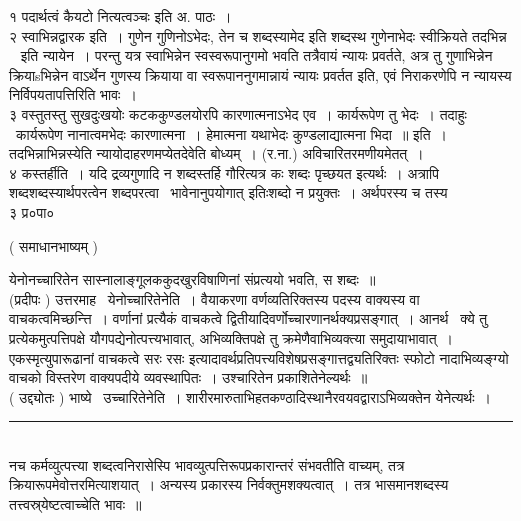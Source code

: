 \documentclass[11pt, openany]{book}
\begin{document}
\begin{multicols}{2}
१ पदार्थत्वं कैयटो नित्यत्वञ्चः इति अ. पाठः~।\\

२ स्वाभिन्नद्वारक इति~। गुणेन गुणिनोऽभेदः, तेन च शब्दस्यामेद इति शब्दस्थ गुणेनाभेदः स्वीक्रियते {\qt तदभिन्न \textendash\ } इति न्यायेन~। परन्तु यत्र स्वाभिन्नेन स्वस्वरूपानुगमो भवति तत्रैवायं न्यायः प्रवर्तते, अत्र तु गुणाभिन्नेन क्रियाsभिन्नेन वाऽर्थेन गुणस्य क्रियाया वा स्वरूपाननुगमान्नायं न्यायः प्रवर्तत इति, एवं निराकरणेपि न न्यायस्य निर्विपयतापत्तिरिति भावः~।\\

३ वस्तुतस्तु सुखदुःखयोः कटककुण्डलयोरपि कारणात्मनाऽभेद एव~। कार्यरूपेण तु भेदः~। तदाहुः \textendash\ {\qt कार्यरूपेण नानात्वमभेदः कारणात्मना~। हेमात्मना यथाभेदः कुण्डलाद्यात्मना भिदा~॥} इति~। तदभिन्नाभिन्नस्येति न्यायोदाहरणमप्येतदेवेति बोध्यम्~। (र.ना.) अविचारितरमणीयमेतत्~।\\

४ कस्तर्हीति~। यदि द्रव्यगुणादि न शब्दस्तर्हि गौरित्यत्र कः शब्दः पृच्छयत इत्यर्थः~। अत्रापि शब्दशब्दस्यार्थपरत्वेन शब्दपरत्वा \textendash\ भावेनानुपयोगात् इतिःशब्दो न प्रयुक्तः~। अर्थपरस्य च तस्य\\

३ प्र०पा० 

\columnbreak

\begin{center}
( समाधानभाष्यम् )
\end{center}

येनोनच्चारितेन सास्नालाङ्गूलककुदखुरविषाणिनां संप्रत्ययो भवति, स शब्दः~॥\\

(प्रदीपः ) उत्तरमाह \textendash\ येनोच्चारितेनेति~। वैयाकरणा वर्णव्यतिरिक्तस्य पदस्य वाक्यस्य वा वाचकत्वमिच्छन्त्ति~। वर्णानां प्रत्यैकं वाचकत्वे द्वितीयादिवर्णोच्चारणानर्थक्यप्रसङ्गात्~। आनर्थ \textendash\ क्ये तु प्रत्येकमुत्पत्तिपक्षे यौगपद्येनोत्पत्त्यभावात्, अभिव्यक्तिपक्षे तु क्रमेणैवाभिव्यक्त्या समुदायाभावात्~। एकस्मृत्युपारूढानां वाचकत्वे {\qt सरः रसः} इत्यादावर्थप्रतिपत्त्यविशेषप्रसङ्गात्तद्व्यतिरिक्तः स्फोटो नादाभिव्यङ्ग्यो वाचको विस्तरेण वाक्यपदीये व्यवस्थापितः~। उश्चारितेन प्रकाशितेनेल्यर्थः~॥\\

( उद्द्योतः ) भाष्ये \textendash\ उच्चारितेनेति~।  शारीरमारुताभिहतकण्ठादिस्थानैरवयवद्वाराऽभिव्यक्तेन येनेत्यर्थः~।

\noindent
\rule{1\linewidth}{0.5pt}\\

\noindent
नच कर्मव्युत्पत्त्या शब्दत्वनिरासेस्पि भावव्युत्पत्तिरूपप्रकारान्तरं संभवतीति वाच्यम्, तत्र क्रियारूपमेवोत्तरमित्याशयात्~। अन्यस्य प्रकारस्य निर्वक्तुमशक्यत्वात्~। तत्र भासमानशब्दस्य तत्त्वस्र्येष्टत्वाच्चेति भावः~॥\\


\end{multicols}
\end{document}
